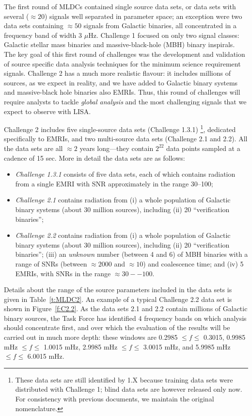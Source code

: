 \documentclass[12pt]{iopart}
\begin{document}
The first round of MLDCs contained single source data sets, or data sets with several ($\approx 20$) signals well separated in parameter space; an exception were two data sets containing $\approx 50$ signals from Galactic binaries, all concentrated in a frequency band of width 3 $\mu$Hz. Challenge 1 focused on only two signal classes: Galactic stellar mass binaries and massive-black-hole (MBH) binary inspirals. The key goal of this first round of challenges was the development and validation of source specific data analysis techniques for the minimum science requirement signals. Challenge 2 has a much more realistic flavour: it includes millions of sources, as we expect in reality, and we have added to Galactic binary systems and massive-black hole binaries also EMRIs. Thus, this round of challenges will require analysts to tackle \emph{global analysis} and the most challenging signals that we expect to observe with LISA. 

Challenge 2 includes five single-source data sets (Challenge 1.3.1)%
\footnote{These data sets are still identified by 1.X because training data sets were distributed with Challenge 1; blind data sets are however released only now. For consistency with previous documents, we maintain the original nomenclature.},
% 
dedicated specifically to EMRIs, and two multi-source data sets (Challenge 2.1 and 2.2). All the data sets are all $\approx 2$ years long---they contain $2^{22}$ data points sampled at a cadence of 15 sec. More in detail the data sets are as follows: 
\begin{itemize}
\item \emph{Challenge 1.3.1} consists of five data sets, each of which contains radiation from a single EMRI with SNR approximately in the range 30--100;
\item \emph{Challenge 2.1} contains radiation from (i) a whole population of Galactic binary systems (about 30 million sources), including (ii) 20 ``verification binaries'';
\item \emph{Challenge 2.2} contains radiation from (i) a whole population of Galactic binary systems (about 30 million sources), including (ii) 20 ``verification binaries''; (iii) an \emph{unknown} number (between 4 and 6) of MBH binaries with a range of SNRs (between $\approx 2000$ and $\approx 10$) and coalescence time; and (iv) 5 EMRIs, with SNRs in the range $\approx 30--100$.
\end{itemize}
Details about the range of the source parameters included in the data sets is given in Table~\ref{t:MLDC2}. An example of a typical Challenge 2.2 data set is shown in Figure~\ref{f:C2.2}. As the data sets 2.1 and 2.2 contain millions of Galactic binary sources, the Task Force has identified 4 frequency bands on which analysis should concentrate first, and over which the evaluation of the results will be carried out in much more depth: these windows  are 0.2985 $\le f \le$ 0.3015, 0.9985 mHz $\le f \le$ 1.0015 mHz, 2.9985 mHz $\le f \le$ 3.0015 mHz, and 5.9985 mHz $\le f \le$ 6.0015 mHz.  
\end{document}
